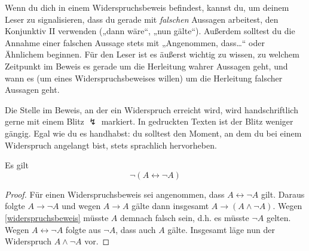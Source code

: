   
\begin{bem}
    Wenn du dich in einem Widerspruchsbeweis befindest, kannst du, um deinem Leser zu signalisieren, dass du gerade mit \emph{falschen} Aussagen arbeitest, den Konjunktiv II verwenden („dann wäre“, „nun gälte“). Außerdem solltest du die Annahme einer falschen Aussage stets mit „Angenommen, dass\dots“ oder Ähnlichem beginnen. Für den Leser ist es äußerst wichtig zu wissen, zu welchem Zeitpunkt im Beweis es gerade um die Herleitung wahrer Aussagen geht, und wann es (um eines Widerspruchsbeweises willen) um die Herleitung falscher Aussagen geht.
    
    Die Stelle im Beweis, an der ein Widerspruch erreicht wird, wird handschriftlich gerne mit einem Blitz $\lightning$ markiert. In gedruckten Texten ist der Blitz weniger gängig. Egal wie du es handhabst: du solltest den Moment, an dem du bei einem Widerspruch angelangt bist, stets sprachlich hervorheben.
\end{bem}


\begin{satz}[*] \label{paradox}
    Es gilt
        \[ \neg (A\leftrightarrow \neg A) \]
\end{satz}
\begin{proof}
    Für einen Widerspruchsbeweis sei angenommen, dass $A\leftrightarrow \neg A$ gilt. Daraus folgte $A\to \neg A$ und wegen $A\to A$ gälte dann insgesamt $A\to (A\land \neg A)$. Wegen \cref{widerspruchsbeweis} müsste $A$ demnach falsch sein, d.h. es müsste $\neg A$ gelten. Wegen $A\leftrightarrow \neg A$ folgte aus $\neg A$, dass auch $A$ gälte. Insgesamt läge nun der Widerspruch $A\land \neg A$ vor.
\end{proof}



